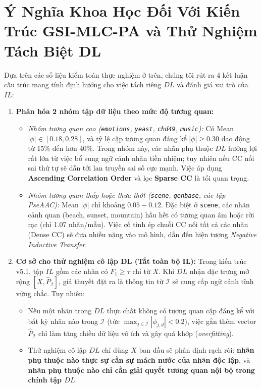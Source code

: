 \documentclass[11pt,a4paper]{article}
\begin{document}
\section{Ý Nghĩa Khoa Học Đối Với Kiến Trúc GSI-MLC-PA và Thử Nghiệm Tách Biệt DL}
Dựa trên các số liệu kiểm toán thực nghiệm ở trên, chúng tôi rút ra 4 kết luận cấu trúc mang tính định hướng cho việc tách riêng $DL$ và đánh giá vai trò của $IL$:
\begin{enumerate}[leftmargin=*]
  \item \textbf{Phân hóa 2 nhóm tập dữ liệu theo mức độ tương quan:} 
  \begin{itemize}
    \item \textit{Nhóm tương quan cao (\texttt{emotions}, \texttt{yeast}, \texttt{chd49}, \texttt{music}):} Có Mean $|\phi| \in [0.18, 0.28]$, và tỷ lệ cặp tương quan đáng kể $|\phi| \ge 0.30$ dao động từ 15\% đến hơn 40\%. Trong nhóm này, các nhãn phụ thuộc $DL$ hưởng lợi rất lớn từ việc bổ sung ngữ cảnh nhãn tiền nhiệm; tuy nhiên nếu CC nối sai thứ tự sẽ dẫn tới lan truyền sai số cực mạnh. Việc áp dụng \textbf{Ascending Correlation Order} và lọc \textbf{Sparse CC} là tối quan trọng.
    \item \textit{Nhóm tương quan thấp hoặc thưa thớt (\texttt{scene}, \texttt{genbase}, các tập PseAAC):} Mean $|\phi|$ chỉ khoảng $0.05 - 0.12$. Đặc biệt ở \texttt{scene}, các nhãn cảnh quan (beach, sunset, mountain) hầu hết có tương quan âm hoặc rời rạc (chỉ 1.07 nhãn/mẫu). Việc cố tình ép chuỗi CC nối tất cả các nhãn (Dense CC) sẽ đưa nhiễu nặng vào mô hình, dẫn đến hiện tượng \textit{Negative Inductive Transfer}.
  \end{itemize}
  \item \textbf{Cơ sở cho thử nghiệm cô lập DL (Tắt toàn bộ IL):}
  Trong kiến trúc v5.1, tập $IL$ gồm các nhãn có $F_1 \ge \tau$ chỉ từ $X$. Khi $DL$ nhận đặc trưng mở rộng $[X, \hat{P}_{\mathcal{I}}]$, giả thuyết đặt ra là thông tin từ $\mathcal{I}$ sẽ cung cấp ngữ cảnh tĩnh vững chắc. Tuy nhiên:
  \begin{itemize}
    \item Nếu một nhãn trong $DL$ thực chất không có tương quan cặp đáng kể với bất kỳ nhãn nào trong $\mathcal{I}$ (tức $\max_{j \in \mathcal{I}} |\phi_{j, d}| < 0.2$), việc gắn thêm vector $\hat{P}_{\mathcal{I}}$ chỉ làm tăng chiều dữ liệu vô ích và gây quá khớp (\textit{overfitting}).
    \item Thử nghiệm cô lập $DL$ chỉ dùng $X$ ban đầu sẽ phân định rạch ròi: \textbf{nhãn phụ thuộc nào thực sự cần sự mách nước của nhãn độc lập}, và \textbf{nhãn phụ thuộc nào chỉ cần giải quyết tương quan nội bộ trong chính tập $DL$}.

\end{itemize}
\end{enumerate}
\end{document}
